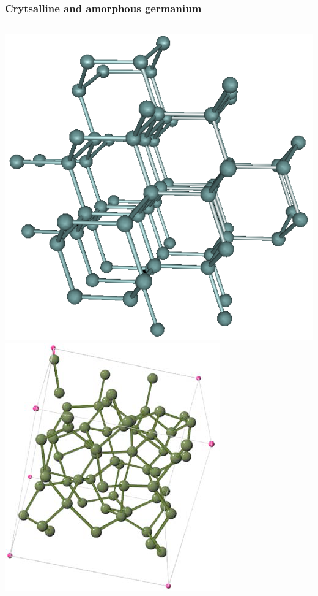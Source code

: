 \documentclass[10pt, xcolor=x11names, compress]{beamer}
\begin{document}
\begin{frame}[fragile]
  \frametitle{Crytsalline and amorphous germanium}
  \begin{columns}
    \begin{column}{0.30\linewidth}
      \includegraphics[width=\linewidth]{images/cGe.png}\\
      \includegraphics[width=\linewidth]{images/aGe.png}

\end{column}
\end{columns}
\end{frame}
\end{document}
